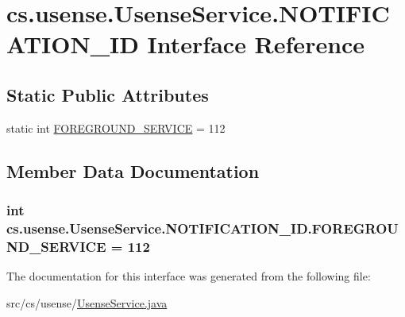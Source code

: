 \hypertarget{interfacecs_1_1usense_1_1_usense_service_1_1_n_o_t_i_f_i_c_a_t_i_o_n___i_d}{}\section{cs.\+usense.\+Usense\+Service.\+N\+O\+T\+I\+F\+I\+C\+A\+T\+I\+O\+N\+\_\+\+I\+D Interface Reference}
\label{interfacecs_1_1usense_1_1_usense_service_1_1_n_o_t_i_f_i_c_a_t_i_o_n___i_d}
\subsection*{Static Public Attributes}
\begin{DoxyCompactItemize}
\item 
static int \hyperlink{interfacecs_1_1usense_1_1_usense_service_1_1_n_o_t_i_f_i_c_a_t_i_o_n___i_d_a530d70ff505d390ae5d1b3a9117a0987}{F\+O\+R\+E\+G\+R\+O\+U\+N\+D\+\_\+\+S\+E\+R\+V\+I\+C\+E} = 112
\end{DoxyCompactItemize}


\subsection{Member Data Documentation}
\hypertarget{interfacecs_1_1usense_1_1_usense_service_1_1_n_o_t_i_f_i_c_a_t_i_o_n___i_d_a530d70ff505d390ae5d1b3a9117a0987}{}
\subsubsection[{F\+O\+R\+E\+G\+R\+O\+U\+N\+D\+\_\+\+S\+E\+R\+V\+I\+C\+E}]{\setlength{\rightskip}{0pt plus 5cm}int cs.\+usense.\+Usense\+Service.\+N\+O\+T\+I\+F\+I\+C\+A\+T\+I\+O\+N\+\_\+\+I\+D.\+F\+O\+R\+E\+G\+R\+O\+U\+N\+D\+\_\+\+S\+E\+R\+V\+I\+C\+E = 112\hspace{0.3cm}{\ttfamily [static]}}\label{interfacecs_1_1usense_1_1_usense_service_1_1_n_o_t_i_f_i_c_a_t_i_o_n___i_d_a530d70ff505d390ae5d1b3a9117a0987}


The documentation for this interface was generated from the following file\+:\begin{DoxyCompactItemize}
\item 
src/cs/usense/\hyperlink{_usense_service_8java}{Usense\+Service.\+java}\end{DoxyCompactItemize}

